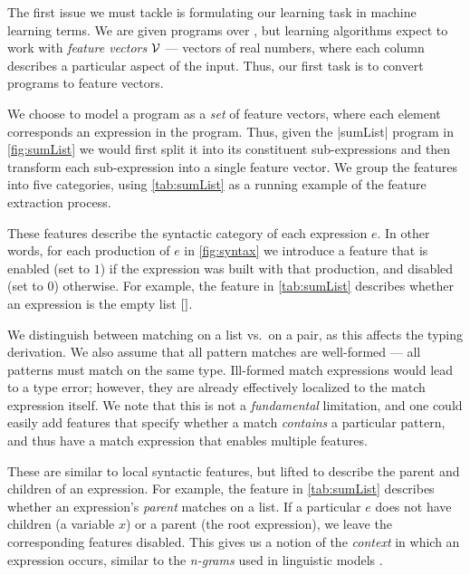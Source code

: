 The first issue we must tackle is formulating our learning task in
machine learning terms.
%
We are given programs over \lang, but learning algorithms expect to work
with \emph{feature vectors} $\mathcal{V}$ --- vectors of real numbers, where each
column describes a particular aspect of the input.
%
Thus, our first task is to convert programs to feature vectors.

We choose to model a program as a \emph{set} of feature vectors, where
each element corresponds an expression in the program.
%
Thus, given the |sumList| program in \autoref{fig:sumList} we
would first split it into its constituent sub-expressions and then
transform each sub-expression into a single feature vector.
%
We group the features into five categories, using \autoref{tab:sumList}
as a running example of the feature extraction process.

These features describe the syntactic category of each expression $e$.
%
In other words, for each production of $e$ in \autoref{fig:syntax} we
introduce a feature that is enabled (set to $1$) if the expression was
built with that production, and disabled (set to $0$) otherwise.
%
For example, the \IsNil feature in \autoref{tab:sumList} describes
whether an expression is the empty list $\mathtt{[]}$.

We distinguish between matching on a list vs.\ on a pair, as this
affects the typing derivation.
%
We also assume that all pattern matches are well-formed --- \ie all
patterns must match on the same type.
%
Ill-formed match expressions would lead to a type error; however, they
are already effectively localized to the match expression itself.
%
We note that this is not a \emph{fundamental} limitation, and one could
easily add features that specify whether a match \emph{contains} a
particular pattern, and thus have a match expression that enables multiple
features.

These are similar to local syntactic features, but lifted to describe the
parent and children of an expression.
%
For example, the \IsCaseListP feature in \autoref{tab:sumList} describes
whether an expression's \emph{parent} matches on a list.
%
If a particular $e$ does not have children (\eg a variable $x$) or a
parent (\ie the root expression), we leave the corresponding features
disabled.
%
This gives us a notion of the \emph{context} in which an expression
occurs, similar to the \emph{n-grams} used in linguistic
models \citep{Hindle2012-hf,Gabel2010-el}.

